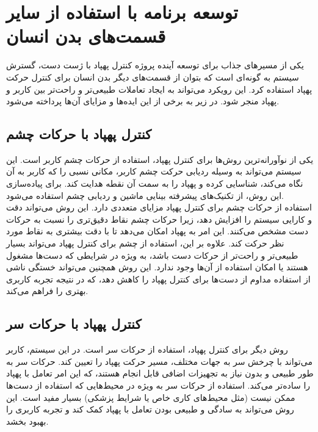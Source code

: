\section{توسعه برنامه با استفاده از سایر قسمت‌های بدن انسان}
یکی از مسیرهای جذاب برای توسعه آینده پروژه کنترل پهپاد با ژست دست، گسترش سیستم به گونه‌ای است که بتوان از قسمت‌های دیگر بدن انسان برای کنترل حرکت پهپاد استفاده کرد. این رویکرد می‌تواند به ایجاد تعاملات طبیعی‌تر و راحت‌تر بین کاربر و پهپاد منجر شود. در زیر به برخی از این ایده‌ها و مزایای آن‌ها پرداخته می‌شود.
\\
\subsection{کنترل پهپاد با حرکات چشم}
یکی از نوآورانه‌ترین روش‌ها برای کنترل پهپاد، استفاده از حرکات چشم کاربر است. این سیستم می‌تواند به وسیله ردیابی حرکت چشم کاربر، مکانی نسبی را که کاربر به آن نگاه می‌کند، شناسایی کرده و پهپاد را به سمت آن نقطه هدایت کند. برای پیاده‌سازی این روش، از تکنیک‌های پیشرفته بینایی ماشین و ردیابی چشم استفاده می‌شود.
\\
استفاده از حرکات چشم برای کنترل پهپاد مزایای متعددی دارد. این روش می‌تواند دقت و کارایی سیستم را افزایش دهد، زیرا حرکات چشم نقاط دقیق‌تری را نسبت به حرکات دست مشخص می‌کنند. این امر به پهپاد امکان می‌دهد تا با دقت بیشتری به نقاط مورد نظر حرکت کند. علاوه بر این، استفاده از چشم برای 
کنترل پهپاد می‌تواند بسیار طبیعی‌تر و راحت‌تر از حرکات دست باشد، به ویژه در شرایطی که دست‌ها مشغول هستند یا امکان استفاده از آن‌ها وجود ندارد. این روش همچنین می‌تواند خستگی ناشی از استفاده مداوم از دست‌ها برای کنترل پهپاد را کاهش دهد، که در نتیجه تجربه کاربری بهتری را فراهم می‌کند.

\subsection{کنترل پهپاد با حرکات سر}
روش دیگر برای کنترل پهپاد، استفاده از حرکات سر است. در این سیستم، کاربر می‌تواند با چرخش سر به جهات مختلف، مسیر حرکت پهپاد را تعیین کند. حرکات سر به طور طبیعی و بدون نیاز به تجهیزات اضافی قابل انجام هستند، که این امر تعامل با پهپاد را
ساده‌تر می‌کند. استفاده از حرکات سر به ویژه در محیط‌هایی که استفاده از دست‌ها ممکن نیست (مثل محیط‌های کاری خاص یا شرایط پزشکی) بسیار مفید است. این روش می‌تواند به سادگی و طبیعی بودن تعامل با پهپاد کمک کند و تجربه کاربری را بهبود بخشد.

